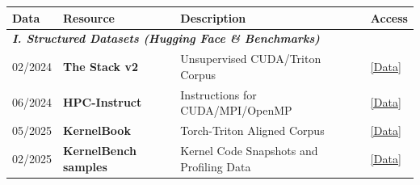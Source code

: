 \begin{table}[h!]
\centering
\begin{tabular}{l l p{6.8cm} l}
\toprule
\textbf{Data} & \textbf{Resource} & \textbf{Description} & \textbf{Access} \\ 

\midrule
\multicolumn{4}{l}{\textit{\textbf{I. Structured Datasets (Hugging Face \& Benchmarks)}}} \\ 
\midrule
02/2024 & \textbf{The Stack v2}~\cite{lozhkov2024stackv2} & Unsupervised CUDA/Triton Corpus & \href{https://huggingface.co/datasets/bigcode/the-stack-v2}{[Data]} \\
06/2024 & \textbf{HPC-Instruct}~\cite{hpcinstruct2024} & Instructions for CUDA/MPI/OpenMP & \href{https://huggingface.co/datasets/hpcgroup/hpc-instruct}{[Data]} \\
05/2025 & \textbf{KernelBook}~\cite{kernelbook2025} & Torch-Triton Aligned Corpus & \href{https://huggingface.co/datasets/GPUMODE/KernelBook}{[Data]} \\
02/2025 & \textbf{KernelBench samples} & Kernel Code Snapshots and Profiling Data & \href{https://huggingface.co/datasets/ScalingIntelligence/kernelbench-samples}{[Data]} \\


\end{tabular}
\end{table}
